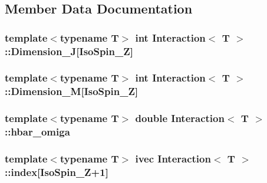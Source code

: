 \subsection{Member Data Documentation}
\hypertarget{class_interaction_ae169b32f8b692bdf54bdae97c2f395be}{
\subsubsection[{Dimension\-\_\-\-J}]{\setlength{\rightskip}{0pt plus 5cm}template$<$typename T$>$ int {\bf Interaction}$<$ T $>$\-::Dimension\-\_\-\-J\mbox{[}{\bf Iso\-Spin\-\_\-\-Z}\mbox{]}}}\label{class_interaction_ae169b32f8b692bdf54bdae97c2f395be}
\hypertarget{class_interaction_afef136dd95339bef3a8c5e8488f6455f}{
\subsubsection[{Dimension\-\_\-\-M}]{\setlength{\rightskip}{0pt plus 5cm}template$<$typename T$>$ int {\bf Interaction}$<$ T $>$\-::Dimension\-\_\-\-M\mbox{[}{\bf Iso\-Spin\-\_\-\-Z}\mbox{]}}}\label{class_interaction_afef136dd95339bef3a8c5e8488f6455f}
\hypertarget{class_interaction_afd1f26a552c012f6444e02a0f2718388}{
\subsubsection[{hbar\-\_\-omiga}]{\setlength{\rightskip}{0pt plus 5cm}template$<$typename T$>$ double {\bf Interaction}$<$ T $>$\-::hbar\-\_\-omiga\hspace{0.3cm}{\ttfamily [private]}}}\label{class_interaction_afd1f26a552c012f6444e02a0f2718388}
\hypertarget{class_interaction_acfc6941cb6a85c4368855da6503a892f}{
\subsubsection[{index}]{\setlength{\rightskip}{0pt plus 5cm}template$<$typename T$>$ ivec {\bf Interaction}$<$ T $>$\-::index\mbox{[}{\bf Iso\-Spin\-\_\-\-Z}+1\mbox{]}}}\label{class_interaction_acfc6941cb6a85c4368855da6503a892f}
